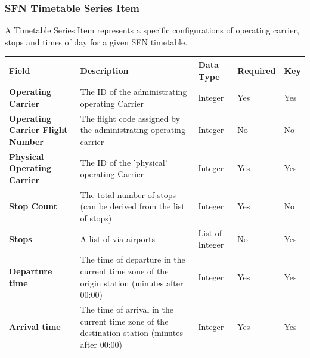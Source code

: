\subsubsection*{SFN Timetable Series Item}

A Timetable Series Item represents a specific configurations of operating carrier, stops and times of day for a given SFN timetable.

\begin{table}[H]
\centering
\begin{tabular}{|p{2.5cm}|p{4cm}|p{2.5cm}|p{2cm}|p{1.2cm}|}
\hline
\textbf{Field}                           & \textbf{Description}                                                                           & \textbf{Data Type}            & \textbf{Required} & \textbf{Key} \\ \hline
\textbf{Operating Carrier}               & The ID of the administrating operating Carrier                                                 & Integer                       & Yes               & Yes          \\ \hline
\textbf{Operating Carrier Flight Number} & The flight code assigned by the administrating operating carrier                               & Integer                       & No                & No           \\ \hline
\textbf{Physical Operating Carrier}      & The ID of the 'physical' operating Carrier                                                     & Integer                       & Yes               & Yes          \\ \hline
\textbf{Stop Count}                      & The total number of stops (can be derived from the list of stops)                              & Integer                       & Yes               & No           \\ \hline
\textbf{Stops}                           & A list of via airports                                                                         & List of Integer               & No                & Yes          \\ \hline
\textbf{Departure time}                  & The time of departure in the current time zone of the origin station (minutes after 00:00)     & Integer                       & Yes               & Yes          \\ \hline
\textbf{Arrival time}                    & The time of arrival in the current time zone of the destination station (minutes after 00:00)  & Integer                       & Yes               & Yes          \\ \hline

\end{tabular}
\end{table}
